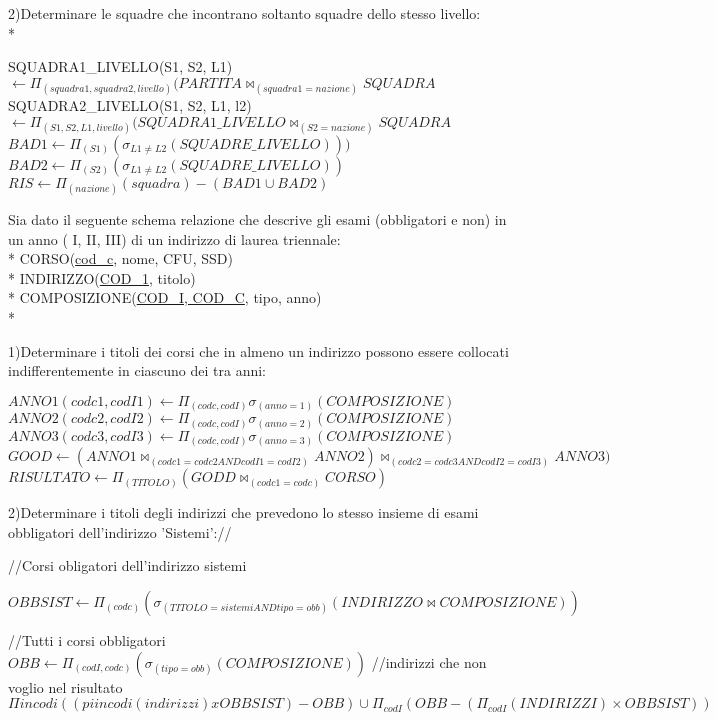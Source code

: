 \documentclass[10pt]{report}
\begin{document}
2)Determinare le squadre che incontrano soltanto squadre dello stesso livello:\\*

\begin{center}
\small
SQUADRA1\_LIVELLO(S1, S2, L1) $\leftarrow \Pi _{(squadra1, squadra2, livello)}(PARTITA \bowtie_{(squadra1 = nazione)} SQUADRA $
SQUADRA2\_LIVELLO(S1, S2, L1, l2) $\leftarrow \Pi _{(S1, S2,L1, livello)}(SQUADRA1\_LIVELLO \bowtie_{(S2 = nazione)} SQUADRA $
$BAD1 \leftarrow \Pi _{(S1)}( \sigma _{L1 \not= L2}(SQUADRE\_LIVELLO)))$\\
$BAD2 \leftarrow \Pi _{(S2)}( \sigma _{L1 \not= L2}(SQUADRE\_LIVELLO))$\\
$RIS \leftarrow \Pi _{(nazione)}(squadra) - (BAD1 \cup BAD2)  $\\
\end{center}
\normalsize

Sia dato il seguente schema relazione che descrive gli esami (obbligatori e non) in un anno ( I, II, III) 
di un indirizzo di laurea triennale: \\*
\newline
CORSO(\underline{cod\_c}, nome, CFU, SSD)\\*
INDIRIZZO(\underline{COD\_1}, titolo)\\*
COMPOSIZIONE(\underline{COD\_I, COD\_C}, tipo, anno)\\*
\newline

1)Determinare i titoli dei corsi che in almeno un indirizzo possono essere collocati indifferentemente in ciascuno dei tra anni:\\

\begin{center}
$ANNO1(codc1,codI1) \leftarrow \Pi _{(codc,codI)} \sigma _{(anno = 1)}(COMPOSIZIONE)$\\
$ANNO2(codc2,codI2) \leftarrow \Pi _{(codc,codI)} \sigma _{(anno = 2)}(COMPOSIZIONE)$\\
$ANNO3(codc3,codI3) \leftarrow \Pi _{(codc,codI)} \sigma _{(anno = 3)}(COMPOSIZIONE)$\\
$GOOD \leftarrow ( ANNO1 \bowtie _{(codc1 = codc2 AND codI1 = codI2)} ANNO2) \bowtie _{(codc2 = codc3 AND codI2 = codI3)} ANNO3)$\\
$RISULTATO \leftarrow \Pi _{(TITOLO)}(GODD \bowtie _{(codc1 = codc)}CORSO)$\\
\end{center}

2)Determinare i titoli degli indirizzi che prevedono lo stesso insieme di esami obbligatori dell'indirizzo 'Sistemi'://

//Corsi obligatori dell'indirizzo sistemi
\begin{center}
$OBBSIST \leftarrow \Pi _{(codc)} (\sigma _{(TITOLO = sistemi AND tipo = obb)}(INDIRIZZO \bowtie COMPOSIZIONE))$
\end{center}
//Tutti i corsi obbligatori
$OBB \leftarrow \Pi _{(codI, codc)} (\sigma _{(tipo = obb)} (COMPOSIZIONE))$
//indirizzi che non voglio nel risultato
$\Pi in cod i ((pi in codi(indirizzi) x OBBSIST) - OBB) \cup \Pi _{codI} (OBB - (\Pi _{codI}(INDIRIZZI) \times OBBSIST))$
\end{document}
